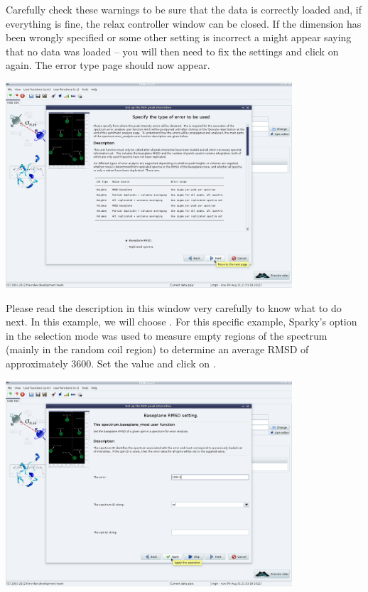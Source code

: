Carefully check these warnings to be sure that the data is correctly loaded and, if everything is fine, the relax controller window can be closed.  If the dimension has been wrongly specified or some other setting is incorrect a  might appear saying that no data was loaded -- you will then need to fix the settings and click on  again.
The error type page should now appear.

\begin{minipage}[h]{\linewidth}
\centerline{\includegraphics[width=0.8\textwidth, bb=14 14 1415 1019]{graphics/screenshots/noe_analysis/peak_intensity4}}
\end{minipage}

Please read the description in this window very carefully to know what to do next.  In this example, we will choose .  For this specific example, Sparky's  option in the  selection mode was used to measure empty regions of the spectrum (mainly in the random coil region) to determine an average RMSD of approximately 3600.  Set the value and click on .

\begin{minipage}[h]{\linewidth}
\centerline{\includegraphics[width=0.8\textwidth, bb=14 14 1415 1019]{graphics/screenshots/noe_analysis/peak_intensity5}}
\end{minipage}

